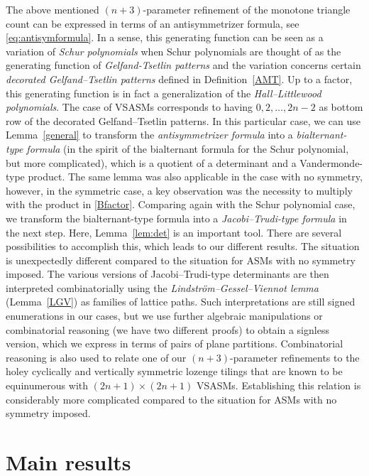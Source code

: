 \documentclass[12pt]{amsart}
\theoremstyle{definition}
\numberwithin{equation}{section}
\begin{document}
The above mentioned $(n+3)$-parameter refinement of the monotone triangle count can be expressed in terms of an antisymmetrizer formula, see \eqref{eq:antisymformula}. In a sense, this generating function can be seen as a variation 
of \emph{Schur polynomials} when Schur polynomials are thought of as the generating function of 
\emph{Gelfand-Tsetlin patterns} and the variation concerns certain \emph{decorated Gelfand--Tsetlin patterns} defined in Definition~\ref{AMT}. Up to a
factor, this generating function is in fact a generalization of the \emph{Hall--Littlewood polynomials}.
The case of VSASMs corresponds to having $0,2,\ldots,2n-2$ as bottom row of the decorated Gelfand--Tsetlin patterns. In this particular case, we can use Lemma~\ref{general} to transform the \emph{antisymmetrizer formula} into a \emph{bialternant-type formula} (in the spirit of the bialternant formula for the Schur polynomial, but more complicated), which is a quotient of a determinant and a Vandermonde-type product. The same lemma was also applicable in the case with no symmetry, however, in the symmetric case, a key observation was the necessity to multiply with the product in \eqref{Bfactor}. Comparing again with the Schur polynomial case, we transform the bialternant-type formula into a \emph{Jacobi--Trudi-type formula} in the next step. Here, Lemma~\ref{lem:det} is an important tool. There are several possibilities 
to accomplish this, which leads to our different results. The situation is unexpectedly different compared to the situation for ASMs with no symmetry imposed.
The various versions of Jacobi--Trudi-type determinants are then interpreted combinatorially using the \emph{Lindstr\"om--Gessel--Viennot lemma} (Lemma~\ref{LGV}) as families of lattice paths. Such interpretations are still signed enumerations in our cases, but we use further algebraic manipulations or combinatorial reasoning (we have two different proofs) to obtain a signless version, which we express in terms of pairs of plane partitions. Combinatorial reasoning is also used to relate one of our $(n+3)$-parameter refinements to the holey cyclically and vertically symmetric lozenge tilings that are known to be equinumerous with $(2n+1) \times (2n+1)$ VSASMs. Establishing this relation is considerably more complicated compared to the situation for ASMs with no symmetry imposed.

\section{Main results}
\label{sec:MainResults}
\end{document}
